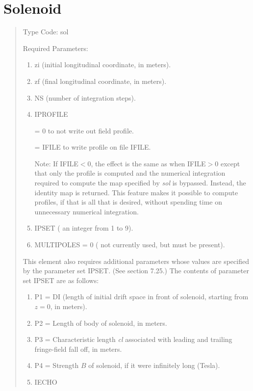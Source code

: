 \newpage



\section{Solenoid}
\begin{quotation}
\noindent     Type Code:  sol
\vspace{5mm}

\noindent Required Parameters:
\begin{enumerate}
      \item  zi (initial longitudinal coordinate, in meters).
      \item  zf (final longitudinal coordinate, in meters).
      \item  NS (number of integration steps).
      \item  IPROFILE

             = 0 to not write out field profile.

             = IFILE to write profile on file IFILE.

             Note: If IFILE$<0$, the effect is the same as when IFILE$>0$ except that
             only the profile is computed and the numerical integration required to
             compute the map specified by {\em sol } is bypassed.  Instead, the identity
             map is returned.  This feature makes it possible to compute profiles, if
             that is all that is desired, without spending time on unnecessary
             numerical integration.
      \item  IPSET ( an integer from 1 to 9).
      \item MULTIPOLES = 0 ( not currently used, but must be present).
\end{enumerate}
This element also requires additional parameters whose values are
specified by the parameter set IPSET.  (See section 7.25.)  The contents of parameter set
IPSET are as follows:
\begin{enumerate}
      \item P1 = DI (length of initial drift space in front of solenoid,
            starting from \hspace*{3em}$z=0$, in meters).
      \item P2 = Length of body of solenoid, in meters.
      \item P3 = Characteristic length {\em cl} associated with leading and
       trailing fringe-field \hspace*{2.5em}fall off, in meters.
      \item P4 = Strength $B$ of solenoid, if it were infinitely long (Tesla).
      \item  IECHO


\end{enumerate}
\end{quotation}
